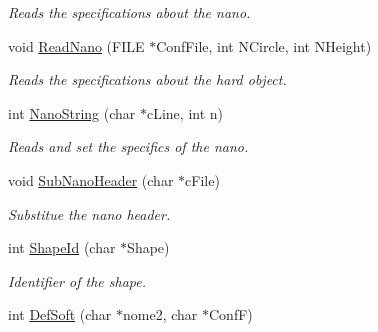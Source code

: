 \begin{DoxyCompactItemize}
\begin{DoxyCompactList}\small\item\em \-Reads the specifications about the nano. \end{DoxyCompactList}\item 
\hypertarget{classVarData_ae1bc84ff2d8831db8949506045848d0f}{void \hyperlink{classVarData_ae1bc84ff2d8831db8949506045848d0f}{\-Read\-Nano} (\-F\-I\-L\-E $\ast$\-Conf\-File, int \-N\-Circle, int \-N\-Height)}\label{classVarData_ae1bc84ff2d8831db8949506045848d0f}

\begin{DoxyCompactList}\small\item\em \-Reads the specifications about the hard object. \end{DoxyCompactList}\item 
\hypertarget{classVarData_a0d71010a276631e9621af79f7a41a6bc}{int \hyperlink{classVarData_a0d71010a276631e9621af79f7a41a6bc}{\-Nano\-String} (char $\ast$c\-Line, int n)}\label{classVarData_a0d71010a276631e9621af79f7a41a6bc}

\begin{DoxyCompactList}\small\item\em \-Reads and set the specifics of the nano. \end{DoxyCompactList}\item 
\hypertarget{classVarData_aede3befcfc5ac25f61c9d9ed00e66f18}{void \hyperlink{classVarData_aede3befcfc5ac25f61c9d9ed00e66f18}{\-Sub\-Nano\-Header} (char $\ast$c\-File)}\label{classVarData_aede3befcfc5ac25f61c9d9ed00e66f18}

\begin{DoxyCompactList}\small\item\em \-Substitue the nano header. \end{DoxyCompactList}\item 
\hypertarget{classVarData_aa5eca7387a47bfde4d54ef7ec03b1dc1}{int \hyperlink{classVarData_aa5eca7387a47bfde4d54ef7ec03b1dc1}{\-Shape\-Id} (char $\ast$\-Shape)}\label{classVarData_aa5eca7387a47bfde4d54ef7ec03b1dc1}

\begin{DoxyCompactList}\small\item\em \-Identifier of the shape. \end{DoxyCompactList}\item 
\hypertarget{classVarData_a82c7f45c23289466fed080c06d340974}{int \hyperlink{classVarData_a82c7f45c23289466fed080c06d340974}{\-Def\-Soft} (char $\ast$nome2, char $\ast$\-Conf\-F)}\label{classVarData_a82c7f45c23289466fed080c06d340974}


\end{DoxyCompactItemize}
